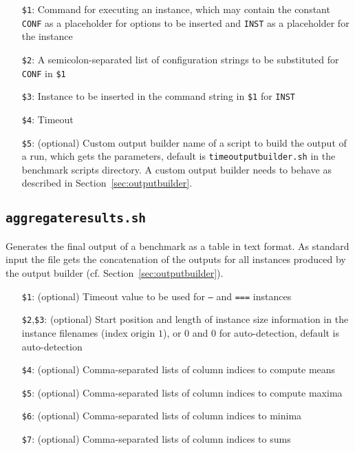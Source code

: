 \documentclass[a4paper]{article}
\begin{document}
		    \medskip{}
		    \begin{itemize}
				\item[{\tt \$1}:] Command for executing an instance, which may contain the constant {\tt CONF} as a placeholder
					for options to be inserted and {\tt INST} as a placeholder for the instance
				\item[{\tt \$2}:] A semicolon-separated list of configuration strings to be substituted for {\tt CONF} in {\tt \$1}
				\item[{\tt \$3}:] Instance to be inserted in the command string in {\tt \$1} for {\tt INST}
				\item[{\tt \$4}:] Timeout
				\item[{\tt \$5}:] (optional) Custom output builder name of a script to build the output of a run, which gets the parameters, default is {\tt timeoutputbuilder.sh}
					in the benchmark scripts directory. A custom output builder needs to behave as described in Section~\ref{sec:outputbuilder}.
		    \end{itemize}
				
		\subsection{\tt aggregateresults.sh}
		
		    Generates the final output of a benchmark as a table in text format.
		    As standard input the file gets the concatenation of the outputs for all instances produced by the output builder (cf. Section~\ref{sec:outputbuilder}).
		
		    \medskip{}
		    \begin{itemize}
				\item[{\tt \$1}:] (optional) Timeout value to be used for {\tt ---} and {\tt ===} instances
				\item[{\tt \$2},{\tt \$3}:] (optional) Start position and length of instance size information in the instance filenames (index origin $1$),
					or $0$ and $0$ for auto-detection, default is auto-detection
				\item[{\tt \$4}:] (optional) Comma-separated lists of column indices to compute means
				\item[{\tt \$5}:] (optional) Comma-separated lists of column indices to compute maxima
				\item[{\tt \$6}:] (optional) Comma-separated lists of column indices to minima
				\item[{\tt \$7}:] (optional) Comma-separated lists of column indices to sums
		    \end{itemize}
		
\end{document}
